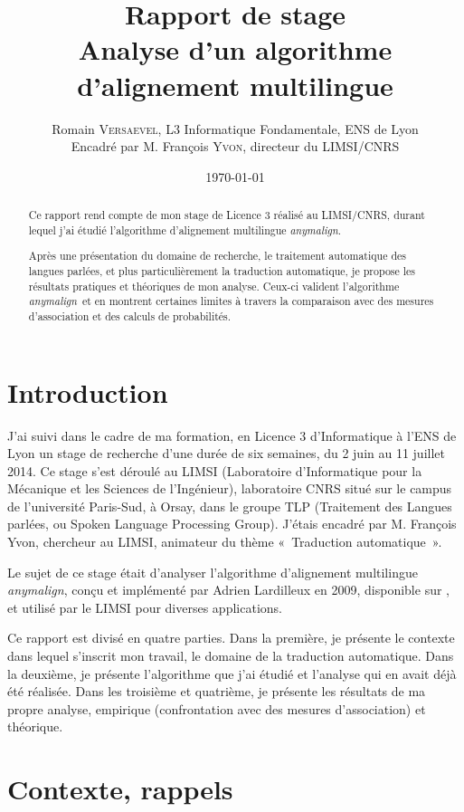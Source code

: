 \documentclass[a4paper,10pt]{article}
\title{ \Large Rapport de stage \\ \LARGE Analyse d'un algorithme d'alignement multilingue}
\author{\normalsize Romain \textsc{Versaevel}, L3 Informatique Fondamentale, ENS de Lyon \\ \normalsize Encadré par M. François \textsc{Yvon}, directeur du LIMSI/CNRS \\}
\date{\today}
\newcommand{\anym}{\emph{anymalign}}
\newcommand{\guill}[1]{«~#1~»}
\begin{document}
\maketitle

\begin{abstract}
Ce rapport rend compte de mon stage de Licence 3 réalisé au LIMSI/CNRS, durant lequel j'ai étudié l'algorithme d'alignement multilingue \anym .

Après une présentation du domaine de recherche, le traitement automatique des langues parlées, et plus particulièrement la traduction automatique, je propose les résultats pratiques et théoriques de mon analyse. Ceux-ci valident l'algorithme \anym~et en montrent certaines limites à travers la comparaison avec des mesures d'association et des calculs de proba\-bilités.
\end{abstract}

\newpage
\tableofcontents
\newpage

\section{Introduction}
J'ai suivi dans le cadre de ma formation, en Licence 3 d'Informatique à l'ENS de Lyon un stage de recherche d'une durée de six semaines, du 2 juin au 11 juillet 2014. Ce stage s'est déroulé au LIMSI (Laboratoire d'Informatique pour la Mécanique et les Sciences de l'Ingénieur), laboratoire CNRS situé sur le campus de l'université Paris-Sud, à Orsay, dans le groupe TLP (Traitement des Langues parlées, ou Spoken Language Processing Group). J'étais encadré par M. François Yvon, chercheur au LIMSI, animateur du thème \guill{Traduction automatique}.

Le sujet de ce stage était d'analyser l'algorithme d'alignement multilingue \anym, conçu et implémenté par Adrien Lardilleux en 2009, disponible sur \cite{anymalign}, et utilisé par le LIMSI pour diverses applications.

Ce rapport est divisé en quatre parties. Dans la première, je présente le contexte dans lequel s'inscrit mon travail, le domaine de la traduction automatique. Dans la deuxième, je présente l'algorithme que j'ai étudié et l'analyse qui en avait déjà été réalisée. Dans les troisième et quatrième, je présente les résultats de ma propre analyse, empirique (confrontation avec des mesures d'association) et théorique.



\section{Contexte, rappels}
\end{document}
